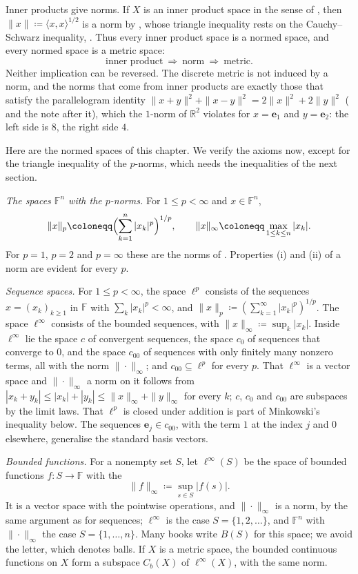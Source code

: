 Inner products give norms. If $X$ is an inner product space in the sense of , then $\|x\|\coloneqq\langle x,x\rangle^{1/2}$ is a norm by , whose triangle inequality rests on the Cauchy--Schwarz inequality, . Thus every inner product space is a normed space, and every normed space is a metric space:
\[
\text{inner product}\ \Longrightarrow\ \text{norm}\ \Longrightarrow\ \text{metric}.
\]
Neither implication can be reversed. The discrete metric is not induced by a norm, and the norms that come from inner products are exactly those that satisfy the parallelogram identity $\|x+y\|^2+\|x-y\|^2=2\|x\|^2+2\|y\|^2$ ( and the note after it), which the $1$-norm of $\mathbb R^2$ violates for $x=\mathbf e_1$ and $y=\mathbf e_2$: the left side is $8$, the right side $4$.

Here are the normed spaces of this chapter. We verify the axioms now, except for the triangle inequality of the $p$-norms, which needs the inequalities of the next section.

\emph{The spaces $\mathbb F^n$ with the $p$-norms.} For $1\le p<\infty$ and $x\in\mathbb F^n$,
\[
\|x\|_p\coloneqq\Bigl(\sum_{k=1}^n|x_k|^p\Bigr)^{1/p},\qquad\|x\|_\infty\coloneqq\max_{1\le k\le n}|x_k| .
\]
For $p=1$, $p=2$ and $p=\infty$ these are the norms of . Properties (i) and (ii) of a norm are evident for every $p$.

\emph{Sequence spaces.} For $1\le p<\infty$, the space $\ell^p$ consists of the sequences $x=(x_k)_{k\ge1}$ in $\mathbb F$ with $\sum_k|x_k|^p<\infty$, and $\|x\|_p\coloneqq(\sum_{k=1}^\infty|x_k|^p)^{1/p}$. The space $\ell^\infty$ consists of the bounded sequences, with $\|x\|_\infty\coloneqq\sup_k|x_k|$. Inside $\ell^\infty$ lie the space $c$ of convergent sequences, the space $c_0$ of sequences that converge to $0$, and the space $c_{00}$ of sequences with only finitely many nonzero terms, all with the norm $\|\cdot\|_\infty$; and $c_{00}\subseteq\ell^p$ for every $p$. That $\ell^\infty$ is a vector space and $\|\cdot\|_\infty$ a norm on it follows from $|x_k+y_k|\le|x_k|+|y_k|\le\|x\|_\infty+\|y\|_\infty$ for every $k$; $c$, $c_0$ and $c_{00}$ are subspaces by the limit laws. That $\ell^p$ is closed under addition is part of Minkowski's inequality below. The sequences $\mathbf e_j\in c_{00}$, with the term $1$ at the index $j$ and $0$ elsewhere, generalise the standard basis vectors.

\emph{Bounded functions.} For a nonempty set $S$, let $\ell^\infty(S)$ be the space of bounded functions $f\colon S\to\mathbb F$ with the 
\[
\|f\|_\infty\coloneqq\sup_{s\in S}|f(s)| .
\]
It is a vector space with the pointwise operations, and $\|\cdot\|_\infty$ is a norm, by the same argument as for sequences; $\ell^\infty$ is the case $S=\{1,2,\ldots\}$, and $\mathbb F^n$ with $\|\cdot\|_\infty$ the case $S=\{1,\ldots,n\}$. Many books write $B(S)$ for this space; we avoid the letter, which denotes balls. If $X$ is a metric space, the bounded continuous functions on $X$ form a subspace $C_b(X)$ of $\ell^\infty(X)$, with the same norm.

